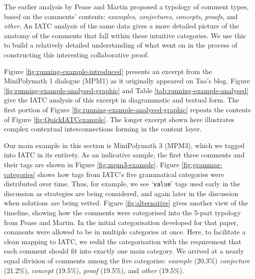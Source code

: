 \documentclass[smallextended,oneside]{svjour3}       %
\newcommand\nothing[1]{#1}
\let\paragraph\nothing
\begin{document}
{The earlier analysis by Pease and Martin proposed a typology of comment types, based on the comments' contents:
\emph{examples},
\emph{conjectures},
\emph{concepts},
\emph{proofs},
and \emph{other}.  
An IATC analysis of the same data gives a more detailed picture of the anatomy of the comments that fall within these intuitive categories.  We use this to build a relatively detailed understanding of what went on in the process of constructing this interesting collaborative proof.




\paragraph{Figure \ref{fig:running-example-introduced} presents an excerpt from the MiniPolymath 1 dialogue (MPM1) as it originally appeared on Tao's blog.}
Figure \ref{fig:running-example-analysed-graphic} and Table
\ref{tab:running-example-analysed} give the IATC analysis of this
excerpt in diagrammatic and textual form.  The first portion of Figure
\ref{fig:running-example-analysed-graphic} repeats the contents of Figure
\ref{fig:QuickIATCexample}.  The longer excerpt shown here illustrates
complex contextual interconnections forming in the content
layer.

\paragraph{Our main example in this section is MiniPolymath 3 (MPM3),
which we tagged into IATC in its entirety.}
As an indicative sample, the first three comments and their tags are shown in Figure
\ref{fig:mpm3-example}.
Figure \ref{fig:grammar-categories} shows how tags from IATC's five grammatical
categories were distributed over time.  Thus, for example, we see
`\texttt{value}' tags used early in the discussion as strategies are
being considered, and again later in the discussion when solutions are
being vetted.
Figure \ref{fig:alternative} gives another view of the timeline,
showing how the comments were categorised into the 5-part typology
from Pease and Martin.  In the initial
categorisation developed for that paper, comments were allowed to be
in multiple categories at once.
\paragraph{Here, to facilitate a clean mapping to IATC, we redid the categorisation with the requirement that each comment should fit into exactly one main category.}
We arrived at a nearly equal division of comments among the five categories:
\emph{example} (20.3\%) \emph{conjecture} (21.2\%),
\emph{concept} (19.5\%), \emph{proof} (19.5\%), and \emph{other}
(19.5\%).  

}
\end{document}
